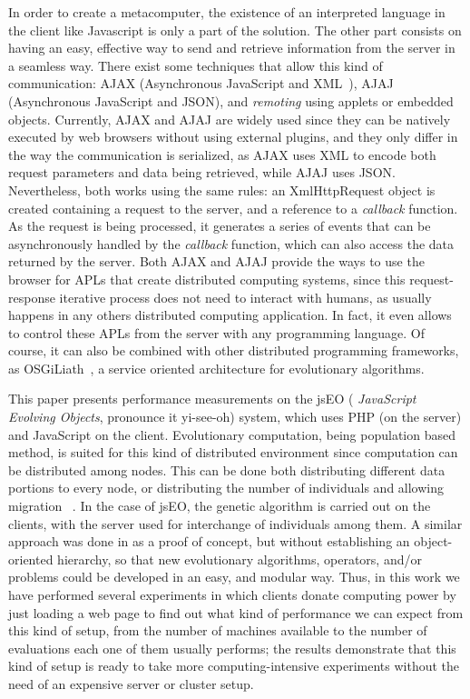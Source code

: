 \documentclass[runningheads,a4paper]{llncs}
\begin{document}
In order to create a metacomputer, the existence of an interpreted language in the client like Javascript is only a part of the solution. The other part consists on having an easy, effective way to send and retrieve information from the server in a seamless way. There exist some techniques that allow this kind of communication: AJAX (Asynchronous JavaScript and
XML~\cite{brinzarea2010ajax}), AJAJ (Asynchronous JavaScript and JSON), and {\em remoting} using
applets or embedded objects. Currently, AJAX and AJAJ are widely used since they can be natively executed by web browsers without using external plugins, and they only differ in the way the communication is serialized, as AJAX uses XML\cite{goldberg2009xml} to encode both request parameters and data being retrieved, while AJAJ uses JSON. Nevertheless, both works using the same rules: an {\sf XmlHttpRequest} object is created  containing a request to the server, and a reference to a {\em callback} function. 
As the request is being processed, it generates a series of events that can be asynchronously handled by the {\em callback} function, which can also access the data returned by the server.
Both AJAX and AJAJ provide the ways to use the browser for APLs that create distributed computing systems, since this request-response iterative process does not need to interact with humans, as usually happens in any others distributed computing application.
In fact, it even allows to control these APLs from the server with any programming
language. Of course, it can also be combined with other distributed
programming frameworks, as OSGiLiath~\cite{DBLP:journals/soco/Garcia-SanchezGCAG13}, a service oriented architecture for evolutionary algorithms.


This paper presents performance measurements on the jsEO ({\em
  JavaScript Evolving Objects}, pronounce it yi-see-oh) system, which uses PHP 
 (on the server) and JavaScript on the client. Evolutionary computation, being population based method, is suited for this
kind of distributed environment since computation can be distributed among nodes. This can be done both distributing different data portions to every node, or distributing the number of individuals and allowing migration ~\cite{cantu-paz:migration-policies}. In the case of jsEO, the genetic algorithm is carried out  on the clients,
with the server used  for interchange of individuals among
them. A similar approach was done in \cite{agajaj} as a proof of concept, but without establishing an object-oriented hierarchy, so that new evolutionary algorithms, operators, and/or problems could be developed in an easy, and modular way.
Thus, in this work we have performed several experiments in which clients donate
computing power by just loading a web page to find out what kind of
performance we can expect from this kind of setup, from the number of
machines available to the number of evaluations each one of them
usually performs; the results demonstrate that this kind of setup is ready to take more
computing-intensive experiments without the need of an expensive server or cluster
setup. 
\end{document}
